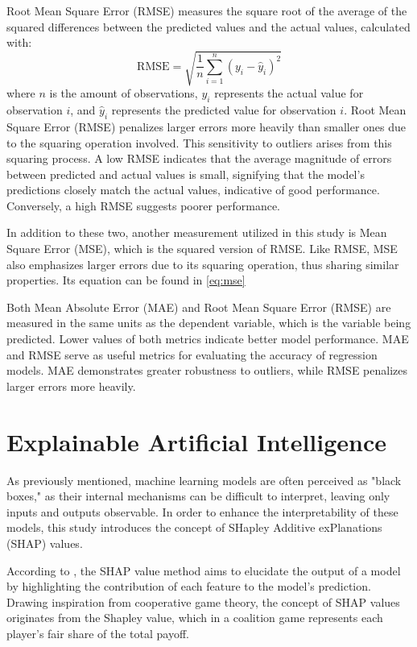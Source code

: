 \documentclass[12pt,a4paper,english
]{tunithesis}
\begin{document}
Root Mean Square Error (RMSE) measures the square root of the average of the squared differences between the predicted values and the actual values, calculated with: 
\begin{equation}
    \mathrm{RMSE}=\sqrt{\frac{1}{n} \sum_{i=1}^n\left(y_i-\hat{y}_i\right)^2}
\end{equation}
where $n$ is the amount of observations, $y_i$ represents the actual value for observation $i$, and $\hat{y}_i$ represents the predicted value for observation $i$. Root Mean Square Error (RMSE) penalizes larger errors more heavily than smaller ones due to the squaring operation involved. This sensitivity to outliers arises from this squaring process. A low RMSE indicates that the average magnitude of errors between predicted and actual values is small, signifying that the model's predictions closely match the actual values, indicative of good performance. Conversely, a high RMSE suggests poorer performance.

In addition to these two, another measurement utilized in this study is Mean Square Error (MSE), which is the squared version of RMSE. Like RMSE, MSE also emphasizes larger errors due to its squaring operation, thus sharing similar properties. Its equation can be found in \ref{eq:mse}

Both Mean Absolute Error (MAE) and Root Mean Square Error (RMSE) are measured in the same units as the dependent variable, which is the variable being predicted. Lower values of both metrics indicate better model performance. MAE and RMSE serve as useful metrics for evaluating the accuracy of regression models. MAE demonstrates greater robustness to outliers, while RMSE penalizes larger errors more heavily. 

\section{Explainable Artificial Intelligence}
As previously mentioned, machine learning models are often perceived as "black boxes," as their internal mechanisms can be difficult to interpret, leaving only inputs and outputs observable. In order to enhance the interpretability of these models, this study introduces the concept of SHapley Additive exPlanations (SHAP) values.  

According to \textcite{lundberg2017, camilla_shap}, the SHAP value method aims to elucidate the output of a model by highlighting the contribution of each feature to the model's prediction. Drawing inspiration from cooperative game theory, the concept of SHAP values originates from the Shapley value, which in a coalition game represents each player's fair share of the total payoff.
\end{document}
